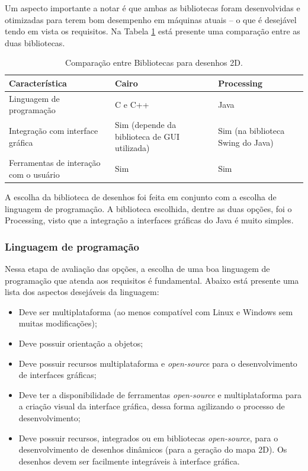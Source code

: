 Um aspecto importante a notar é que ambas as bibliotecas foram desenvolvidas e otimizadas para terem bom desempenho em máquinas atuais -- o que é desejável tendo em vista os requisitos. Na Tabela \ref{tab:alternativas_desenho} está presente uma comparação entre as duas bibliotecas.


\begin{table}[h]
  \caption{Comparação entre Bibliotecas para desenhos 2D.}
  \centering
  \begin{tabular}{p{6cm}|p{4cm}p{4cm}}
    \toprule
    \textbf{Característica} & \textbf{Cairo} & \textbf{Processing} \\
    \midrule
    Linguagem de programação & C e C++ & Java \\
    \hline
    Integração com interface gráfica & Sim (depende da biblioteca de GUI utilizada) & Sim (na biblioteca Swing do Java) \\
    \hline
    Ferramentas de interação com o usuário & Sim & Sim \\
    \bottomrule
  \end{tabular}
  \label{tab:alternativas_desenho}
\end{table}

A escolha da biblioteca de desenhos foi feita em conjunto com a escolha de linguagem de programação. A biblioteca escolhida, dentre as duas opções, foi o Processing, visto que a integração a interfaces gráficas do Java é muito simples. 

\subsubsection{Linguagem de programação}

Nessa etapa de avaliação das opções, a escolha de uma boa linguagem de programação que atenda aos requisitos é fundamental. Abaixo está presente uma lista dos aspectos desejáveis da linguagem:

\begin{itemize}
  \item Deve ser multiplataforma (ao menos compatível com Linux e Windows sem muitas modificações);
  \item Deve possuir orientação a objetos;
  \item Deve possuir recursos multiplataforma e \textit{open-source} para o desenvolvimento de interfaces gráficas;
  \item Deve ter a disponibilidade de ferramentas \textit{open-source} e multiplataforma para a criação visual da interface gráfica, dessa forma agilizando o processo de desenvolvimento;
  \item Deve possuir recursos, integrados ou em bibliotecas \textit{open-source}, para o desenvolvimento de desenhos dinâmicos (para a geração do mapa 2D). Os desenhos devem ser facilmente integráveis à interface gráfica.
\end{itemize}


